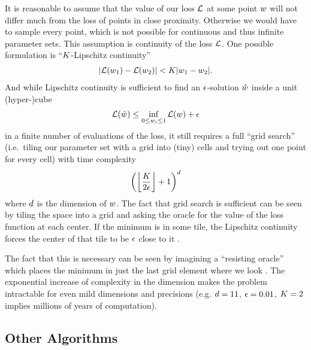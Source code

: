 It is reasonable to assume that the value of our loss \(\mathcal{L}\) at some point
\(w\) will not differ much from the loss of points in close proximity.
Otherwise we would have to sample every point, which is not possible for continuous
and thus infinite parameter sets. This assumption is continuity of the loss
\(\mathcal{L}\). One possible formulation is ``\(K\)-Lipschitz continuity''
%
\begin{align*}
	| \mathcal{L}(w_1) - \mathcal{L}(w_2) | < K | w_1 - w_2 |.
\end{align*}
%
And while Lipschitz continuity is sufficient to find an \(\epsilon\)-solution
\(\hat{w}\) inside a unit (hyper-)cube
%
\begin{align*}
	\mathcal{L}(\hat{w}) \le \inf_{ 0\le w_i\le 1} \mathcal{L}(w) + \epsilon
\end{align*}
%
in a finite number of evaluations of the loss, it still requires a full
``grid search'' (i.e.\ tiling our parameter set with a grid into (tiny) cells
and trying out one point for every cell) with time complexity \parencite[pp.
12,13]{nesterovLecturesConvexOptimization2018}
%
\begin{align*}
	\left(\left\lfloor \frac{K}{2\epsilon}\right\rfloor + 1\right)^d
\end{align*}
%
where \(d\) is the dimension of \(w\). The fact that grid search is
sufficient can be seen by tiling the space into a grid and asking the oracle
for the value of the loss function at each center. If the minimum is in
some tile, the Lipschitz continuity forces the center of that tile to be \(\epsilon\)
close to it \parencite[cf.][p. 11]{nesterovLecturesConvexOptimization2018}.

The fact that this is necessary can be seen by imagining a ``resisting
oracle'' which places the minimum in just the last grid element where we look
\parencite[cf.][p. 13]{nesterovLecturesConvexOptimization2018}. The exponential
increase of complexity in the dimension makes the problem intractable for even
mild dimensions and precisions (e.g. \(d=11\), \(\epsilon=0.01\), \(K=2\)
implies millions of years of computation).

\subsection{Other Algorithms}

